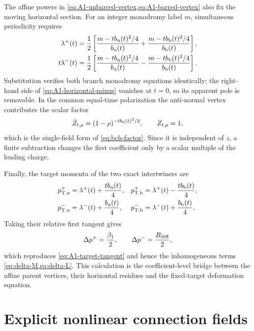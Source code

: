 \documentclass[11pt,a4paper]{article}
\numberwithin{equation}{section}
\theoremstyle{remark}
\begin{document}
The affine powers in \cref{eq:A1-unbarred-vertex,eq:A1-barred-vertex} also fix the moving
horizontal section.  For an integer monodromy label $m$, simultaneous periodicity requires
\begin{align}
 \lambda^+(t)&=\frac12\left[
 \frac{m-tb_{\rm u}(t)^2/4}{b_{\rm u}(t)}
 +\frac{m-tb_{\rm b}(t)^2/4}{b_{\rm b}(t)}\right],
 \label{eq:A1-horizontal-plus}\\
 t\lambda^-(t)&=\frac12\left[
 \frac{m-tb_{\rm u}(t)^2/4}{b_{\rm u}(t)}
 -\frac{m-tb_{\rm b}(t)^2/4}{b_{\rm b}(t)}\right].
 \label{eq:A1-horizontal-minus}
\end{align}
Substitution verifies both branch monodromy equations identically; the right-hand side of
\cref{eq:A1-horizontal-minus} vanishes at $t=0$, so its apparent pole is removable.  In the
common equal-time polarization the anti-normal vertex contributes the scalar factor
\begin{equation}
 \bar Z_{t,\rho}=(1-\rho)^{-t b_{\rm b}(t)^2/2},\qquad Z_{t,\rho}=1,
 \label{eq:A1-BCH-factor}
\end{equation}
which is the single-field form of \cref{eq:bch-factor}.  Since it is independent of $z$, a finite
subtraction changes the first coefficient only by a scalar multiple of the leading charge.

Finally, the target momenta of the two exact intertwiners are
\begin{align}
 p_{{\rm T},\rm u}^+&=\lambda^+(t)+\frac{t b_{\rm u}(t)}4,
 &p_{{\rm T},\rm b}^+&=\lambda^+(t)-\frac{t b_{\rm b}(t)}4,
 \nonumber\\
 p_{{\rm T},\rm u}^-&=\lambda^-(t)+\frac{b_{\rm u}(t)}4,
 &p_{{\rm T},\rm b}^-&=\lambda^-(t)+\frac{b_{\rm b}(t)}4.
 \label{eq:A1-target-curves}
\end{align}
Taking their relative first tangent gives
\begin{equation}
 \Delta p^+=\frac{\beta_1}{2},\qquad
 \Delta p^-=\frac{B_{\rm diff}}{2},
 \label{eq:A1-target-difference-check}
\end{equation}
which reproduces \cref{eq:A1-target-tangent} and hence the inhomogeneous terms
\cref{eq:delta-M,eq:delta-L}.  This calculation is the coefficient-level bridge between the
affine parent vertices, their horizontal residues and the fixed-target deformation equation.

\section{Explicit nonlinear connection fields}
\label{app:connection-fields}
\end{document}
